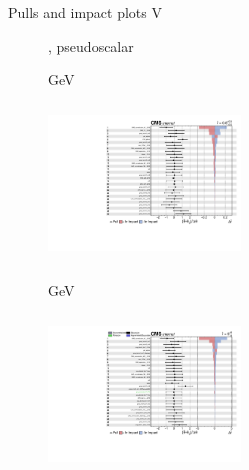 \documentclass[8pt]{beamer}
\begin{document}
\begin{frame}{Pulls and impact plots V}
\justifying
\begin{figure}[htbp]
\centering
\begin{block}{, pseudoscalar}\end{block}	\vspace{-8pt}

\begin{minipage}[b]{0.49\textwidth}
\begin{center}
\centering \begin{block}{ GeV}\end{block}	
\includegraphics[width=5.1cm, height=4.2cm]{figs/impacts_2018_both_pseudo_100.pdf}
\end{center}
\end{minipage}\hfill
\begin{minipage}[b]{0.49\textwidth}
\begin{center}
\centering \begin{block}{ GeV}\end{block}	
\includegraphics[width=5.1cm, height=4.2cm]{figs/impacts_2018_both_pseudo_500.pdf}
\end{center}
\end{minipage} \hfill
\end{figure}
\end{frame}
\end{document}
